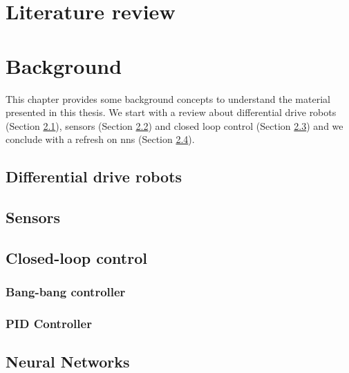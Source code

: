 \chapter{Literature review}
\label{chap:stateoftheart}

\chapter{Background}
\label{chap:background}
This chapter provides some background concepts to understand the material 
presented in this thesis. 
We start with a review about differential drive robots (Section \ref{sec:ddr}), 
sensors (Section \ref{sec:sensors}) and closed loop control (Section 
\ref{sec:closedloop}) and we conclude with a refresh on \glspl{nn} (Section 
\ref{sec:nn}).

\section{Differential drive robots}
\label{sec:ddr}

\section{Sensors}
\label{sec:sensors}

\section{Closed-loop control}
\label{sec:closedloop}
\subsection{Bang-bang controller}
\subsection{PID Controller}

\section{Neural Networks}
\label{sec:nn}

